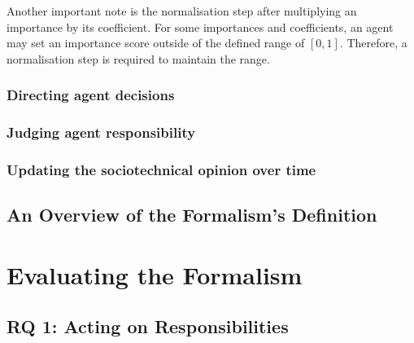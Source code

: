Another important note is the normalisation step after multiplying an importance by its coefficient. For some importances and coefficients, an agent may set an importance score outside of the defined range of \([0,1]\). Therefore, a normalisation step is required to maintain the range.\par


\subsubsection{Directing agent decisions}  %

\subsubsection{Judging agent responsibility}  %

\subsubsection{Updating the sociotechnical opinion over time}


\subsection{An Overview of the Formalism's Definition}


\section{Evaluating the Formalism}

\subsection{RQ 1: Acting on Responsibilities}

